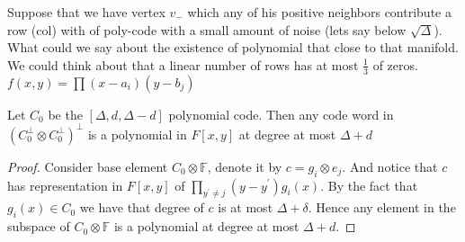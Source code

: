 Suppose that we have vertex $v_{-}$ which any of his positive neighbors contribute a row (col) with of poly-code with a small amount of noise (lets say below $\sqrt{\Delta}$). What could we say about the existence of polynomial that close to that manifold. We could think about that a linear number of rows has at most $\frac{1}{3}$ of zeros.  $ f\left( x,y \right)= \prod{ \left( x - a_{i} \right) \left(  y - b_{j} \right) } $




\begin{claim}
  \label{claim:poldu}
  Let $C_{0}$ be the $[\Delta,d, \Delta-d]$ polynomial code. Then any code word in $\left( C_{0}^{\perp} \otimes C_{0}^{\perp} \right)^{\perp}$ is a polynomial in $F[x,y]$ at degree at most $\Delta + d$
\end{claim}
\begin{proof}
Consider base element $ C_{0} \otimes \mathbb{F} $, denote it by $c = g_{i} \otimes e_{j}$. And notice that $c$ has representation in $F[x,y]$ of $\prod_{y^{\prime} \neq j}{\left( y - y^{\prime} \right) }g_{i}\left( x \right)$. By the fact that $g_{i}\left( x \right) \in C_{0} $ we have that degree of $c$ is at most $\Delta + \delta$. Hence any element in the subspace of $C_{0} \otimes \mathbb{F}$ is a polynomial at degree at most $\Delta + d$.   
\end{proof}



